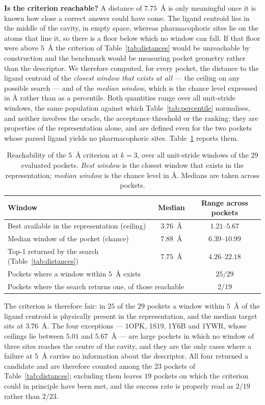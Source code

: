 \textbf{Is the criterion reachable?} A distance of $7.75$~\AA{} is only meaningful once
it is known how close a correct answer could have come. The ligand centroid lies in the
middle of the cavity, in empty space, whereas pharmacophoric sites lie on the atoms that
line it, so there is a floor below which no window can fall. If that floor were above
$5$~\AA{} the criterion of Table~\ref{tab:distances} would be unreachable by
construction and the benchmark would be measuring pocket geometry rather than the
descriptor. We therefore computed, for every pocket, the distance to the ligand centroid
of the \emph{closest window that exists at all} --- the ceiling on any possible search
--- and of the \emph{median window}, which is the chance level expressed in \AA{}
rather than as a percentile. Both quantities range over all unit-stride windows, the same
population against which Table~\ref{tab:percentile} normalises, and neither involves the
oracle, the acceptance threshold or the ranking; they are properties of the
representation alone, and are defined even for the two pockets whose parsed ligand yields
no pharmacophoric sites. Table~\ref{tab:ceiling} reports them.

\begin{table}[htbp]
\centering
\caption{Reachability of the $5$~\AA{} criterion at $k=3$, over all unit-stride windows
of the $29$ evaluated pockets. \emph{Best window} is the closest window that exists in
the representation; \emph{median window} is the chance level in \AA{}. Medians
are taken across pockets.}
\label{tab:ceiling}
\begin{tabular}{lcc}
\toprule
\textbf{Window} & \textbf{Median} & \textbf{Range across pockets} \\
\midrule
Best available in the representation (ceiling) & $3.76$~\AA{} & $1.21$--$5.67$ \\
Median window of the pocket (chance)           & $7.88$~\AA{} & $6.39$--$10.99$ \\
Top-1 returned by the search (Table~\ref{tab:distances}) & $7.75$~\AA{} & $4.26$--$22.18$ \\
\midrule
\multicolumn{2}{l}{Pockets where a window within $5$~\AA{} exists} & $25/29$ \\
\multicolumn{2}{l}{Pockets where the search returns one, of those reachable} & $2/19$ \\
\bottomrule
\end{tabular}
\end{table}

The criterion is therefore fair: in $25$ of the $29$ pockets a window within $5$~\AA{} of
the ligand centroid is physically present in the representation, and the median target
sits at $3.76$~\AA{}. The four exceptions --- 1OPK, 1S19, 1Y6B and 1YWR, whose ceilings
lie between $5.01$ and $5.67$~\AA{} --- are large pockets in which no window of three
sites reaches the centre of the cavity, and they are the only cases where a failure at
$5$~\AA{} carries no information about the descriptor. All four returned a candidate and
are therefore counted among the $23$ pockets of Table~\ref{tab:distances}; excluding them
leaves $19$ pockets on which the criterion could in principle have been met, and the
success rate is properly read as $2/19$ rather than $2/23$.

